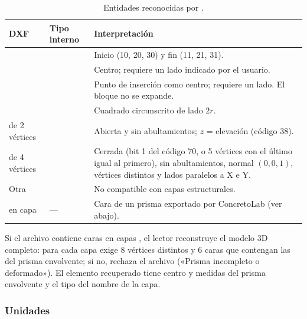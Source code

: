 \begin{table}[H]
	\centering
	\caption{Entidades reconocidas por .}
	\label{tab:mod-dxf-entidades}
	\begin{tabular}{L{3cm}L{3cm}L{7.6cm}}
		\hline
		\textbf{DXF} & \textbf{Tipo interno} & \textbf{Interpretación} \\ \hline
		 &  & Inicio (10, 20, 30) y fin (11, 21, 31). \\
		 &  & Centro; requiere un lado indicado por el usuario. \\
		 &  & Punto de inserción como centro; requiere un lado. El bloque no se expande. \\
		 &  & Cuadrado circunscrito de lado $2r$. \\
		 de 2 vértices &  & Abierta y sin abultamientos; $z$ = elevación (código 38). \\
		 de 4 vértices &  & Cerrada (bit 1 del código 70, o 5 vértices con el
		último igual al primero), sin abultamientos, normal $(0,0,1)$, vértices distintos y lados paralelos a X e Y. \\
		Otra  &  & No compatible con capas estructurales. \\
		 en capa  & --- & Cara de un prisma exportado por
		ConcretoLab (ver abajo). \\
		\hline
	\end{tabular}
\end{table}

Si el archivo contiene caras  en capas , el lector
reconstruye el modelo 3D completo: para cada capa exige 8 vértices distintos y 6 caras que contengan las del prisma
envolvente; si no, rechaza el archivo («Prisma incompleto o deformado»). El elemento recuperado tiene centro y medidas
del prisma envolvente y el tipo del nombre de la capa.

\subsubsection{Unidades}

